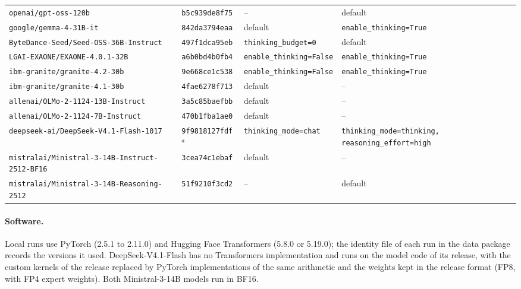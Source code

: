 \begin{table}[htbp]
\begin{tabular}{llp{3.2cm}p{3.5cm}}
\texttt{openai/gpt-oss-120b} & \texttt{b5c939de8f75} & -- & default \\
\texttt{google/gemma-4-31B-it} & \texttt{842da3794eaa} & default & \texttt{enable\_thinking=True} \\
\texttt{ByteDance-Seed/Seed-OSS-36B-Instruct} & \texttt{497f1dca95eb} & \texttt{thinking\_budget=0} & default \\
\texttt{LGAI-EXAONE/EXAONE-4.0.1-32B} & \texttt{a6b0bd4b0fb4} & \texttt{enable\_thinking=False} & \texttt{enable\_thinking=True} \\
\texttt{ibm-granite/granite-4.2-30b} & \texttt{9e668ce1c538} & \texttt{enable\_thinking=False} & \texttt{enable\_thinking=True} \\
\texttt{ibm-granite/granite-4.1-30b} & \texttt{4fae6278f713} & default & -- \\
\texttt{allenai/OLMo-2-1124-13B-Instruct} & \texttt{3a5c85baefbb} & default & -- \\
\texttt{allenai/OLMo-2-1124-7B-Instruct} & \texttt{470b1fba1ae0} & default & -- \\
\texttt{deepseek-ai/DeepSeek-V4.1-Flash-1017} & \texttt{9f9818127fdf}$^{a}$ & \texttt{thinking\_mode=chat} & \texttt{thinking\_mode=thinking, reasoning\_effort=high} \\
\texttt{mistralai/Ministral-3-14B-Instruct-2512-BF16} & \texttt{3cea74c1ebaf} & default & -- \\
\texttt{mistralai/Ministral-3-14B-Reasoning-2512} & \texttt{51f9210f3cd2} & -- & default \\
\bottomrule
\end{tabular}
\end{table}

\paragraph{Software.} Local runs use PyTorch (2.5.1 to 2.11.0) and Hugging Face Transformers (5.8.0 or 5.19.0); the identity file of each run in the data package records the versions it used. DeepSeek-V4.1-Flash has no Transformers implementation and runs on the model code of its release, with the custom kernels of the release replaced by PyTorch implementations of the same arithmetic and the weights kept in the release format (FP8, with FP4 expert weights). Both Ministral-3-14B models run in BF16.

